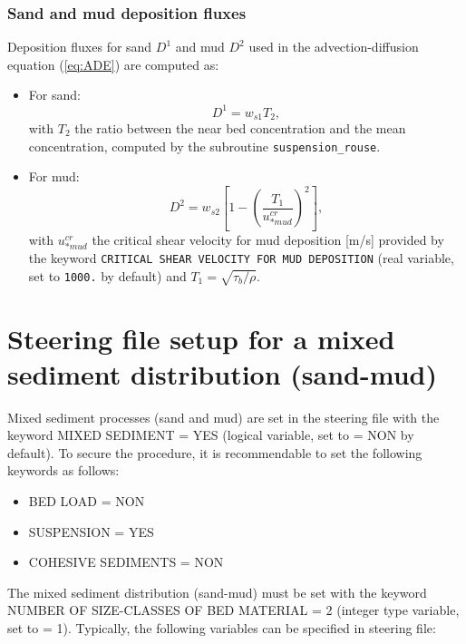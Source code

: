 \subsubsection{Sand and mud deposition fluxes}
Deposition fluxes for sand $D^1$ and mud $D^2$ used in the advection-diffusion equation (\ref{eq:ADE}) are computed as:
\begin{itemize}
\item For sand:
\begin{equation}
D^1 = w_{s1} T_2, 
\end{equation}
with $T_2$ the ratio between the near bed concentration and the mean concentration, computed by the subroutine \texttt{suspension\_rouse}. 

\item For mud:
\begin{equation}
D^2 = w_{s2} \left[1-\left(\frac{T_1}{u_{*mud}^{cr}}\right)^2 \right],
\end{equation}
with $u_{*mud}^{cr}$ the critical shear velocity for mud deposition [m/s] provided by the keyword \texttt{CRITICAL SHEAR VELOCITY FOR MUD DEPOSITION} (real variable, set to \texttt{1000.} by default) and $T_1=\sqrt{\tau_b/\rho}$.

\end{itemize}

\section{Steering file setup for a mixed sediment distribution (sand-mud)}\label{sec:}
Mixed sediment processes (sand and mud) are set in the \sisyphe{} steering file with the keyword
{\ttfamily MIXED SEDIMENT = YES} (logical variable, set to {\ttfamily = NON} by default). To secure the procedure, it is recommendable to set the following keywords as follows:
\begin{itemize}
\item {\ttfamily BED LOAD = NON}
\item {\ttfamily SUSPENSION = YES}
\item {\ttfamily COHESIVE SEDIMENTS = NON}  
\end{itemize}

The mixed sediment distribution (sand-mud) must be set with the keyword {\ttfamily NUMBER OF SIZE-CLASSES OF BED MATERIAL = 2} (integer type variable, set to {\ttfamily = 1}). Typically, the following variables can be specified in steering file:

